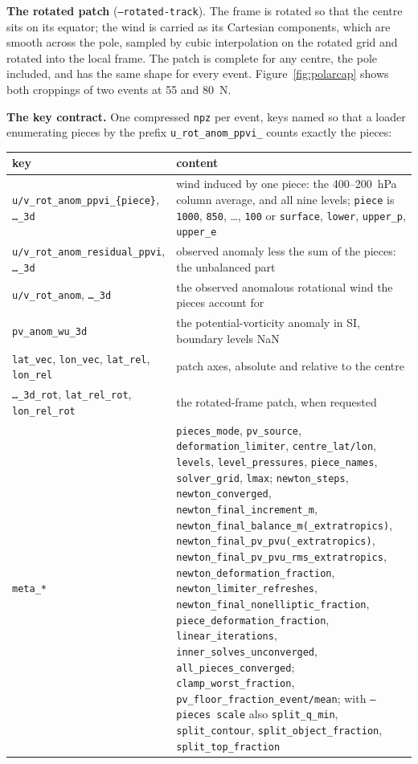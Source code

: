 \documentclass[11pt,a4paper]{article}
\newcommand{\code}[1]{\texttt{#1}}
\begin{document}
\textbf{The rotated patch} (\code{--rotated-track}). The frame is rotated so
that the centre sits on its equator; the wind is carried as its Cartesian
components, which are smooth across the pole, sampled by cubic interpolation
on the rotated grid and rotated into the local frame. The patch is complete
for any centre, the pole included, and has the same shape for every event.
Figure~\ref{fig:polarcap} shows both croppings of two events at 55 and 80~N.

\textbf{The key contract.} One compressed \code{npz} per event, keys named
so that a loader enumerating pieces by the prefix \code{u\_rot\_anom\_ppvi\_}
counts exactly the pieces:
\begin{center}
\small
\begin{tabularx}{\linewidth}{>{\raggedright\arraybackslash}p{5.6cm}L}
\toprule
key & content \\
\midrule
\code{u/v\_rot\_anom\_ppvi\_\{piece\}}, \code{\ldots\_3d} & wind induced by one piece: the 400--200~hPa column average, and all nine levels; \code{piece} is \code{1000}, \code{850}, \ldots, \code{100} or \code{surface}, \code{lower}, \code{upper\_p}, \code{upper\_e} \\
\code{u/v\_rot\_anom\_residual\_ppvi}, \code{\ldots\_3d} & observed anomaly less the sum of the pieces: the unbalanced part \\
\code{u/v\_rot\_anom}, \code{\ldots\_3d} & the observed anomalous rotational wind the pieces account for \\
\code{pv\_anom\_wu\_3d} & the potential-vorticity anomaly in SI, boundary levels NaN \\
\code{lat\_vec}, \code{lon\_vec}, \code{lat\_rel}, \code{lon\_rel} & patch axes, absolute and relative to the centre \\
\code{\ldots\_3d\_rot}, \code{lat\_rel\_rot}, \code{lon\_rel\_rot} & the rotated-frame patch, when requested \\
\code{meta\_*} & \code{pieces\_mode}, \code{pv\_source}, \code{deformation\_limiter}, \code{centre\_lat/lon}, \code{levels}, \code{level\_pressures}, \code{piece\_names}, \code{solver\_grid}, \code{lmax}; \code{newton\_steps}, \code{newton\_converged}, \code{newton\_final\_increment\_m}, \code{newton\_final\_balance\_m(\_extratropics)}, \code{newton\_final\_pv\_pvu(\_extratropics)}, \code{newton\_final\_pv\_pvu\_rms\_extratropics}, \code{newton\_deformation\_fraction}, \code{newton\_limiter\_refreshes}, \code{newton\_final\_nonelliptic\_fraction}, \code{piece\_deformation\_fraction}, \code{linear\_iterations}, \code{inner\_solves\_unconverged}, \code{all\_pieces\_converged}; \code{clamp\_worst\_fraction}, \code{pv\_floor\_fraction\_event/mean}; with \code{--pieces scale} also \code{split\_q\_min}, \code{split\_contour}, \code{split\_object\_fraction}, \code{split\_top\_fraction} \\
\bottomrule
\end{tabularx}
\end{center}
\end{document}
